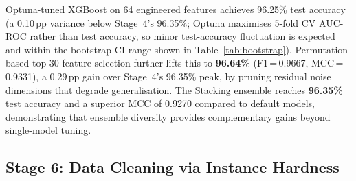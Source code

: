 \documentclass[conference]{IEEEtran}
\begin{document}
\begin{table}[htbp]
\caption{Advanced Model Comparison (same corpus as Stage 4;
3,368/842 split; 64-feature engineered set)}
\label{tab:advanced}
\centering
{}
\end{table}

Optuna-tuned XGBoost on 64 engineered features achieves
96.25\% test accuracy (a 0.10\,pp variance below Stage~4's 96.35\%;
Optuna maximises 5-fold CV AUC-ROC rather than test accuracy, so
minor test-accuracy fluctuation is expected and within the bootstrap
CI range shown in Table~\ref{tab:bootstrap}). Permutation-based top-30 feature selection
further lifts this to \textbf{96.64\%} (F1\,=\,0.9667,
MCC\,=\,0.9331), a 0.29\,pp gain over Stage~4's 96.35\%
peak, by pruning residual noise dimensions that degrade
generalisation. The Stacking ensemble reaches \textbf{96.35\%}
test accuracy and a superior MCC of 0.9270 compared to default
models, demonstrating that ensemble diversity provides
complementary gains beyond single-model tuning.

\subsection{Stage 6: Data Cleaning via Instance Hardness}
\label{sec:hardness_results}
\end{document}
